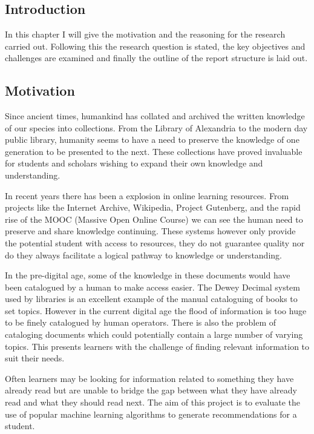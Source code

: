 \chapter{}

\section{Introduction}

In this chapter I will give the motivation and the reasoning for the research carried out.
Following this the research question is stated, the key objectives and challenges are examined and finally the outline of the report structure is laid out.

\section{Motivation}

Since ancient times, humankind has collated and archived the written knowledge of our species into collections.
From the Library of Alexandria to the modern day public library, humanity seems to have a need to preserve the knowledge of one generation to be presented to the next.
These collections have proved invaluable for students and scholars wishing to expand their own knowledge and understanding.

In recent years there has been a explosion in online learning resources.
From projects like the Internet Archive, Wikipedia, Project Gutenberg, and the rapid rise of the MOOC (Massive Open Online Course) we can see the human need to preserve and share knowledge continuing.
These systems however only provide the potential student with access to resources, they do not guarantee quality nor do they always facilitate a logical pathway to knowledge or understanding.

In the pre-digital age, some of the knowledge in these documents would have been catalogued by a human to make access easier.
The Dewey Decimal system used by libraries is an excellent example of the manual cataloguing of books to set topics.
However in the current digital age the flood of information is too huge to be finely catalogued by human operators.
There is also the problem of cataloging documents which could potentially contain a large number of varying topics.
This presents learners with the challenge of finding relevant information to suit their needs.

Often learners may be looking for information related to something they have already read but are unable to bridge the gap between what they have already read and what they should read next.
The aim of this project is to evaluate the use of popular machine learning algorithms to generate recommendations for a student.

